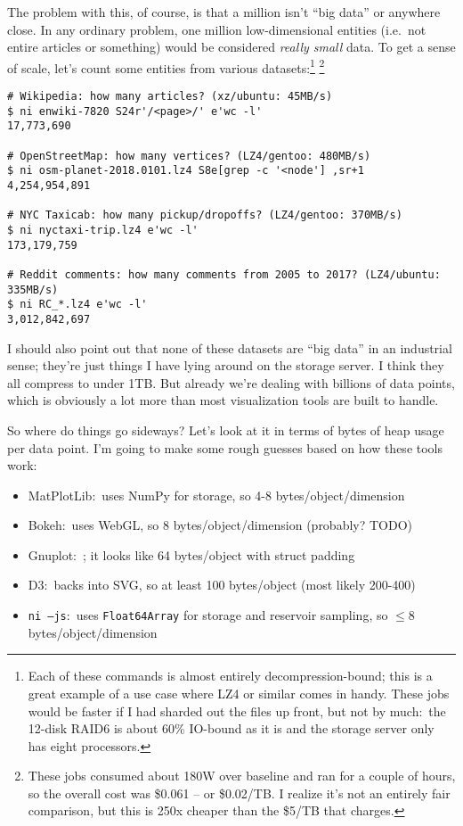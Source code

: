 The problem with this, of course, is that a million isn't ``big data'' or
anywhere close. In any ordinary problem, one million low-dimensional entities
(i.e.~not entire articles or something) would be considered {\it really small}
data. To get a sense of scale, let's count some entities from various
datasets:\footnote{Each of these commands is almost entirely
decompression-bound; this is a great example of a use case where LZ4 or similar
comes in handy. These jobs would be faster if I had sharded out the files up
front, but not by much:~the 12-disk RAID6 is about 60\% IO-bound as it is and
the storage server only has eight processors.} \footnote{These jobs consumed
about 180W over baseline and ran for a couple of hours, so the overall cost was
\$0.061 -- or \$0.02/TB. I realize it's not an entirely fair comparison, but
this is 250x cheaper than the \$5/TB that
 charges.}

\begin{verbatim}
# Wikipedia: how many articles? (xz/ubuntu: 45MB/s)
$ ni enwiki-7820 S24r'/<page>/' e'wc -l'
17,773,690

# OpenStreetMap: how many vertices? (LZ4/gentoo: 480MB/s)
$ ni osm-planet-2018.0101.lz4 S8e[grep -c '<node'] ,sr+1
4,254,954,891

# NYC Taxicab: how many pickup/dropoffs? (LZ4/gentoo: 370MB/s)
$ ni nyctaxi-trip.lz4 e'wc -l'
173,179,759

# Reddit comments: how many comments from 2005 to 2017? (LZ4/ubuntu: 335MB/s)
$ ni RC_*.lz4 e'wc -l'
3,012,842,697\end{verbatim}

I should also point out that none of these datasets are ``big data'' in an
industrial sense; they're just things I have lying around on the storage server.
I think they all compress to under 1TB. But already we're dealing with billions
of data points, which is obviously a lot more than most visualization tools are
built to handle.

So where do things go sideways? Let's look at it in terms of bytes of heap usage
per data point. I'm going to make some rough guesses based on how these tools
work:

\begin{itemize}
  \item MatPlotLib:~uses NumPy for storage, so 4-8 bytes/object/dimension
  \item Bokeh:~uses WebGL, so 8 bytes/object/dimension (probably? TODO)
  \item Gnuplot:~; it looks like 64 bytes/object with struct padding
  \item D3:~backs into SVG, so at least 100 bytes/object (most likely 200-400)
  \item {\tt ni --js}:~uses {\tt Float64Array} for storage and reservoir
        sampling, so $\le$8 bytes/object/dimension
\end{itemize}

